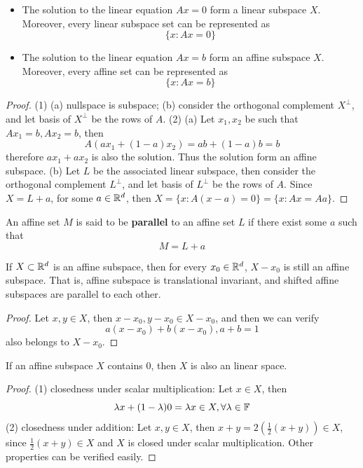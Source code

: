 \begin{refsection}
\begin{lemma}\cite[5]{rockafellar1997convex}\label{ch:convex-analysis:th:affinesetcharacterizationoflinearequation}
\begin{itemize}
\item 	The solution to the linear equation $Ax = 0$ form a linear subspace $X$. Moreover, every linear subspace set can be represented as
	$$\{x: Ax = 0\}$$
\item 	The solution to the linear equation $Ax = b$ form an affine subspace $X$. Moreover, every affine set can be represented as
	$$\{x: Ax = b\}$$	
\end{itemize}
\end{lemma}
\begin{proof}
(1) (a) nullspace is subspace; (b) consider the orthogonal complement $X^\perp$, and let basis of $X^\perp$ be the rows of $A$.
(2) (a)
	Let $x_1,x_2$ be such that $Ax_1 = b,Ax_2 = b$, then
	$$A(ax_1+(1-a)x_2) = ab+(1-a)b = b$$
	therefore $ax_1+ax_2$ is also the solution. Thus the solution form an affine subspace.
	(b) Let $L$ be the associated linear subspace, then consider the orthogonal complement $L^\perp$, and let basis of $L^\perp$ be the rows of $A$. Since $X = L+a$, for some $a\in \mathbb{R}^d$, then $X=\{x:A(x-a)=0\} = \{x:Ax=Aa\}$.
\end{proof}


\begin{definition}
An affine set $M$ is said to be \textbf{parallel} to an affine set $L$ if there exist some $a$ such that 
$$M = L + a$$
\end{definition}

\begin{lemma}
	If $X\subset \mathbb{R}^d$ is an affine subspace, then for every $x_0\in \mathbb{R}^d$, $X-x_0$ is still an affine subspace. That is, affine subspace is translational invariant, and shifted affine subspaces are parallel to each other.
\end{lemma}
\begin{proof}
	Let $x,y \in X$, then $x-x_0,y-x_0 \in X-x_0$, and then we can verify $$a(x-x_0) + b(x-x_0),a+b=1$$ also belongs to $X-x_0$.
\end{proof}


\begin{lemma}\cite[4]{rockafellar1997convex}
    If an affine subspace $X$ contains 0, then $X$ is also an linear space.
\end{lemma}
\begin{proof}
    (1) closedness under scalar multiplication: Let $x\in X$, then
    $$\lambda x + (1-\lambda) 0 = \lambda x \in X,\forall \lambda \in \mathbb{F}$$
    (2) closedness under addition:
    Let $x,y\in X$, then $x+y = 2(\frac{1}{2}(x+y)) \in X$, since $\frac{1}{2}(x+y)\in X$ and $X$ is closed under scalar multiplication.
    Other properties can be verified easily.
\end{proof}


\end{refsection}
